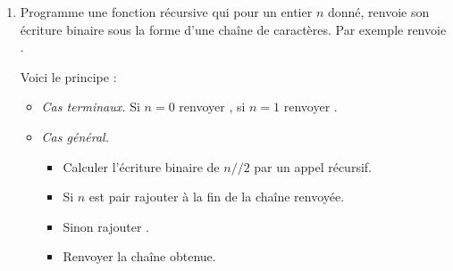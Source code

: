 \documentclass[11pt,class=report,crop=false]{standalone}
\begin{document}
\begin{activite}
\begin{enumerate}
  \item Programme une fonction récursive  qui pour un entier $n$ donné, renvoie son écriture binaire sous la forme d'une chaîne de caractères. Par exemple  renvoie
  .
  
  
  Voici le principe :
  \begin{itemize}
     \item \emph{Cas terminaux.} Si $n=0$ renvoyer , si $n=1$ renvoyer .
    
    \item \emph{Cas général.}
	    \begin{itemize}
	    \item Calculer l'écriture binaire de $n//2$ par un appel récursif.
	    \item Si $n$ est pair rajouter  à la fin de la chaîne renvoyée. 
	    \item Sinon rajouter .
	    \item Renvoyer la chaîne obtenue.
		\end{itemize}
  \end{itemize}
  
  
\end{enumerate}
 
\end{activite}



\end{document}
